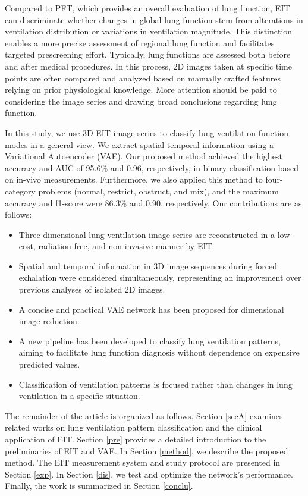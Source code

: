 \documentclass[journal,twoside,web]{ieeecolor}
\begin{document}
Compared to PFT, which provides an overall evaluation of lung function, EIT can discriminate whether changes in global lung function stem from alterations in ventilation distribution or variations in ventilation magnitude. This distinction enables a more precise assessment of regional lung function and facilitates targeted prescreening effort\cite{frerichs2017chest}. Typically, lung functions are assessed both before and after medical procedures. In this process, 2D images taken at specific time points are often compared and analyzed based on manually crafted features relying on prior physiological knowledge. More attention should be paid to considering the image series and drawing broad conclusions regarding lung function. 
 

In this study, we use 3D EIT image series to classify lung ventilation function modes in a general view. We extract spatial-temporal information using a Variational Autoencoder (VAE). Our proposed method achieved the highest accuracy and AUC of 95.6\% and 0.96, respectively, in binary classification based on in-vivo measurements. Furthermore, we also applied this method to four-category problems (normal, restrict, obstruct, and mix), and the maximum accuracy and f1-score were 86.3\% and 0.90, respectively.
Our contributions are as follows:

\begin{itemize}	
	\item Three-dimensional lung ventilation image series are reconstructed in a low-cost, radiation-free, and non-invasive manner by EIT.
	\item Spatial and temporal information in 3D image sequences during forced exhalation were considered simultaneously, representing an improvement over previous analyses of isolated 2D images.
	\item A concise and practical VAE network has been proposed for dimensional image reduction.
	\item A new pipeline has been developed to classify lung ventilation patterns, aiming to facilitate lung function diagnosis without dependence on expensive predicted values.
	\item Classification of ventilation patterns is focused rather than changes in lung ventilation in a specific situation.
\end{itemize}

The remainder of the article is organized as follows. Section \ref{secA} examines related works on lung ventilation pattern classification and the clinical application of EIT. Section \ref{pre} provides a detailed introduction to the preliminaries of EIT and VAE. In Section \ref{method}, we describe the proposed method. The EIT measurement system and study protocol are presented in Section \ref{exp}. In Section \ref{dis}, we test and optimize the network's performance. Finally, the work is summarized in Section \ref{conclu}.
\end{document}

